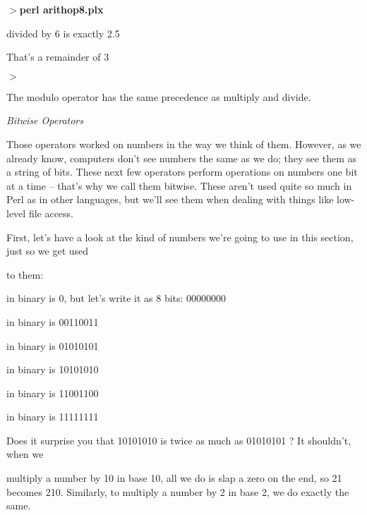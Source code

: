 \documentclass[a4paper,11pt]{book}
\begin{document}
\noindent 

\noindent $>$\textbf{perl arithop8.plx}

 divided by 6 is exactly 2.5

\noindent That's a remainder of 3

\noindent $>$

\noindent 

\noindent The modulo operator has the same precedence as multiply and divide.

\noindent 

\noindent 

\noindent \textit{Bitwise Operators}

\noindent Those operators worked on numbers in the way we think of them. However, as we already know, computers don't see numbers the same as we do; they see them as a string of bits. These next few operators perform operations on numbers one bit at a time -- that's why we call them bitwise. These aren't used quite so much in Perl as in other languages, but we'll see them when dealing with things like low-level file access.

\noindent 

\noindent First, let's have a look at the kind of numbers we're going to use in this section, just so we get used

\noindent to them:

\noindent 

 in binary is 0, but let's write it as 8 bits: 00000000

\noindent 

 in binary is 00110011

\noindent 

 in binary is 01010101

\noindent 

 in binary is 10101010

\noindent 

 in binary is 11001100

\noindent 

 in binary is 11111111

\noindent 

\noindent Does it surprise you that 10101010 is twice as much as 01010101 ? It shouldn't, when we

\noindent multiply a number by 10 in base 10, all we do is slap a zero on the end, so 21 becomes 210. Similarly, to multiply a number by 2 in base 2, we do exactly the same.
\end{document}
